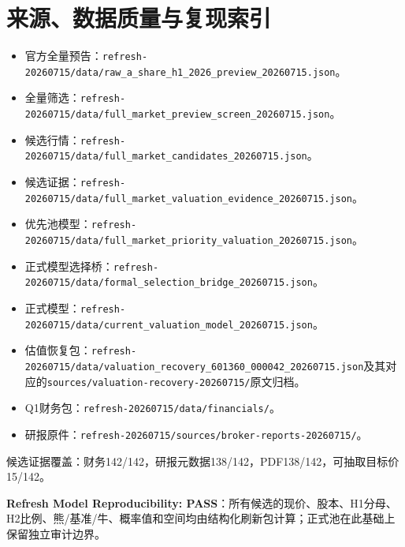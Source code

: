 \chapter{来源、数据质量与复现索引}

\begin{itemize}
\item 官方全量预告：\texttt{refresh-20260715/data/raw\_a\_share\_h1\_2026\_preview\_20260715.json}。
\item 全量筛选：\texttt{refresh-20260715/data/full\_market\_preview\_screen\_20260715.json}。
\item 候选行情：\texttt{refresh-20260715/data/full\_market\_candidates\_20260715.json}。
\item 候选证据：\texttt{refresh-20260715/data/full\_market\_valuation\_evidence\_20260715.json}。
\item 优先池模型：\texttt{refresh-20260715/data/full\_market\_priority\_valuation\_20260715.json}。
\item 正式模型选择桥：\texttt{refresh-20260715/data/formal\_selection\_bridge\_20260715.json}。
\item 正式模型：\texttt{refresh-20260715/data/current\_valuation\_model\_20260715.json}。
\item 估值恢复包：\texttt{refresh-20260715/data/valuation\_recovery\_601360\_000042\_20260715.json}及其对应的\texttt{sources/valuation-recovery-20260715/}原文归档。
\item Q1财务包：\texttt{refresh-20260715/data/financials/}。
\item 研报原件：\texttt{refresh-20260715/sources/broker-reports-20260715/}。
\end{itemize}

候选证据覆盖：财务142/142，研报元数据138/142，PDF138/142，可抽取目标价15/142。

\textbf{Refresh Model Reproducibility: PASS}：所有候选的现价、股本、H1分母、H2比例、熊/基准/牛、概率值和空间均由结构化刷新包计算；正式池在此基础上保留独立审计边界。
